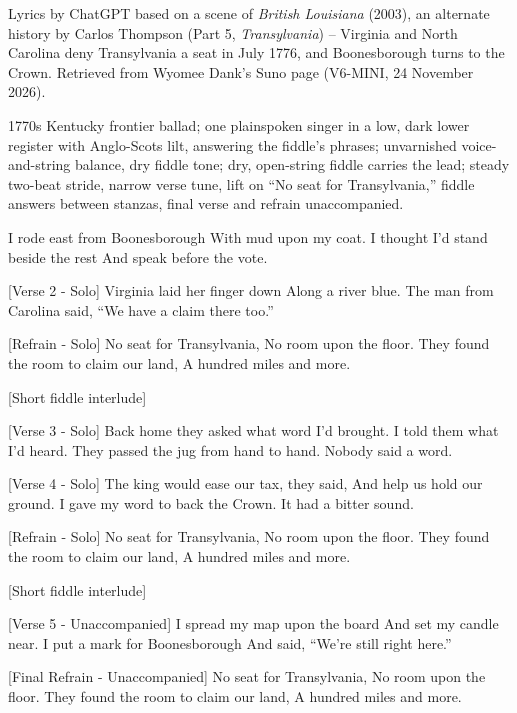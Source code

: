 \begin{notes}
Lyrics by ChatGPT based on a scene of \emph{British Louisiana} (2003), an alternate history by Carlos Thompson (Part 5, \emph{Transylvania}) -- Virginia and North Carolina deny Transylvania a seat in July 1776, and Boonesborough turns to the Crown. Retrieved from Wyomee Dank's Suno page (V6-MINI, 24 November 2026).
\end{notes}
\begin{style}
1770s Kentucky frontier ballad; one plainspoken singer in a low, dark lower register with Anglo-Scots lilt, answering the fiddle’s phrases; unvarnished voice-and-string balance, dry fiddle tone; dry, open-string fiddle carries the lead; steady two-beat stride, narrow verse tune, lift on “No seat for Transylvania,” fiddle answers between stanzas, final verse and refrain unaccompanied.
\end{style}
\begin{lyrics}
I rode east from Boonesborough
With mud upon my coat.
I thought I’d stand beside the rest
And speak before the vote.

[Verse 2 - Solo]
Virginia laid her finger down
Along a river blue.
The man from Carolina said,
“We have a claim there too.”

[Refrain - Solo]
No seat for Transylvania,
No room upon the floor.
They found the room to claim our land,
A hundred miles and more.

[Short fiddle interlude]

[Verse 3 - Solo]
Back home they asked what word I’d brought.
I told them what I’d heard.
They passed the jug from hand to hand.
Nobody said a word.

[Verse 4 - Solo]
The king would ease our tax, they said,
And help us hold our ground.
I gave my word to back the Crown.
It had a bitter sound.

[Refrain - Solo]
No seat for Transylvania,
No room upon the floor.
They found the room to claim our land,
A hundred miles and more.

[Short fiddle interlude]

[Verse 5 - Unaccompanied]
I spread my map upon the board
And set my candle near.
I put a mark for Boonesborough
And said, “We’re still right here.”

[Final Refrain - Unaccompanied]
No seat for Transylvania,
No room upon the floor.
They found the room to claim our land,
A hundred miles and more.
\end{lyrics}

